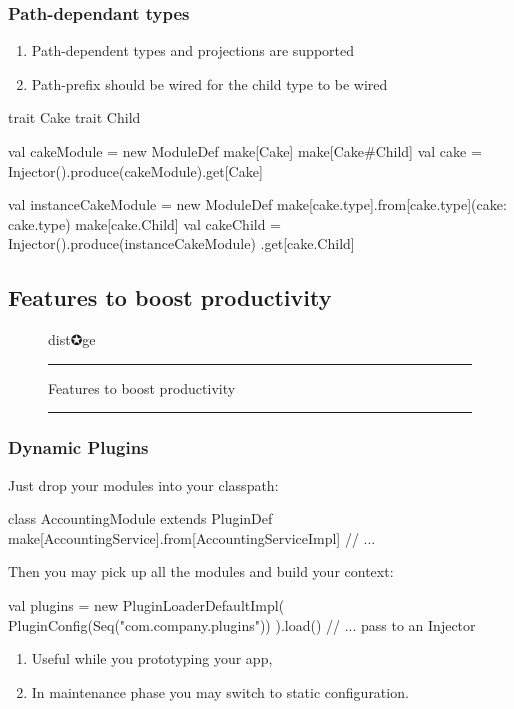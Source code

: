 \documentclass[usenames,dvipsnames]{beamer}
\begin{document}
\begin{frame}[fragile]
\frametitle{Path-dependant types}
\begin{enumerate}
\item Path-dependent types and projections are supported
\item Path-prefix should be wired for the child type to be wired
\end{enumerate}
\begin{scalacode}
trait Cake { trait Child }

val cakeModule = new ModuleDef {
  make[Cake]
  make[Cake#Child]
}
val cake = Injector().produce(cakeModule).get[Cake]

val instanceCakeModule = new ModuleDef {
  make[cake.type].from[cake.type](cake: cake.type)
  make[cake.Child]
}
val cakeChild = Injector().produce(instanceCakeModule)
  .get[cake.Child]
\end{scalacode}
\end{frame}

\subsection{Features to boost productivity}
\begin{frame}
\begin{figure}
\Huge 
\color{RubineRed} dist✪ge
\noindent
\rule{\linewidth}{1mm}
\Large Features to boost productivity
\rule{\linewidth}{1mm}
\end{figure}
\end{frame}

\begin{frame}[fragile]
\frametitle{Dynamic Plugins}
Just drop your modules into your classpath:
\begin{scalacode}
class AccountingModule extends PluginDef {
  make[AccountingService].from[AccountingServiceImpl]
  // ...
}
\end{scalacode}
Then you may pick up all the modules and build your context:
\begin{scalacode}
val plugins = new PluginLoaderDefaultImpl(
  PluginConfig(Seq("com.company.plugins"))
).load()
// ... pass to an Injector
\end{scalacode}
\begin{enumerate}
\item Useful while you prototyping your app,
\item In maintenance phase you may switch to static configuration.
\end{enumerate}
\end{frame}
\end{document}
